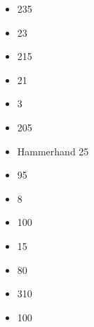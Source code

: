 \begin{itemize}
\begin{multicols}{2}
\begin{itemize}
	\item \lemures{} \basecost{} 235 
	\item \lemures{} \extramodel{} 23 
	\item \myrmidons{} \basecost{} 215 
	\item \myrmidons{} \extramodel{} 21 
	\item \eidolon{} \auraofdespair{} 3 
	\item \titanslayerchariot{} \basecost{} 205 
	\item \titanslayerchariot{} Hammerhand 25 
	\item \clawedfiends{} \extramodel{} 95 
	\item \clawedfiends{} \broodmother{} 8 
	\item \hopeharvester{} \engineofdamnation{} 100 
	\item \hopeharvester{} \auraofdespair{} 15 
	\item \hopeharvester{} \ironhusk{} 80 
	\item \bloatflies{} \basecost{} 310 
	\item \bloatflies{} \extramodel{} 100 
	\end{itemize}
\end{multicols}
\end{itemize}
